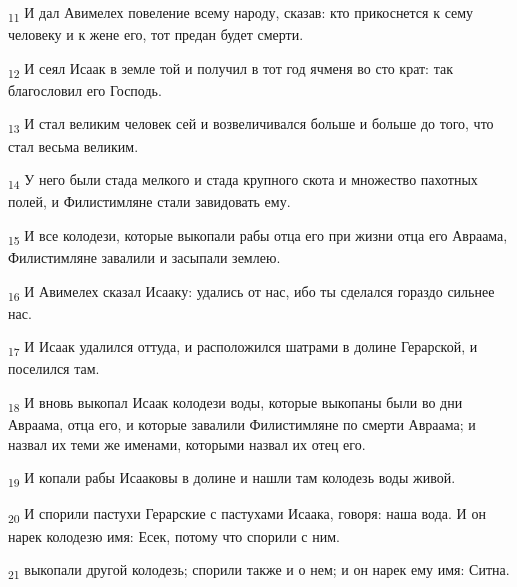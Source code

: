 \begin{tcolorbox}
\textsubscript{11} И дал Авимелех повеление всему народу, сказав: кто прикоснется к сему человеку и к жене его, тот предан будет смерти.
\end{tcolorbox}
\begin{tcolorbox}
\textsubscript{12} И сеял Исаак в земле той и получил в тот год ячменя во сто крат: так благословил его Господь.
\end{tcolorbox}
\begin{tcolorbox}
\textsubscript{13} И стал великим человек сей и возвеличивался больше и больше до того, что стал весьма великим.
\end{tcolorbox}
\begin{tcolorbox}
\textsubscript{14} У него были стада мелкого и стада крупного скота и множество пахотных полей, и Филистимляне стали завидовать ему.
\end{tcolorbox}
\begin{tcolorbox}
\textsubscript{15} И все колодези, которые выкопали рабы отца его при жизни отца его Авраама, Филистимляне завалили и засыпали землею.
\end{tcolorbox}
\begin{tcolorbox}
\textsubscript{16} И Авимелех сказал Исааку: удались от нас, ибо ты сделался гораздо сильнее нас.
\end{tcolorbox}
\begin{tcolorbox}
\textsubscript{17} И Исаак удалился оттуда, и расположился шатрами в долине Герарской, и поселился там.
\end{tcolorbox}
\begin{tcolorbox}
\textsubscript{18} И вновь выкопал Исаак колодези воды, которые выкопаны были во дни Авраама, отца его, и которые завалили Филистимляне по смерти Авраама; и назвал их теми же именами, которыми назвал их отец его.
\end{tcolorbox}
\begin{tcolorbox}
\textsubscript{19} И копали рабы Исааковы в долине и нашли там колодезь воды живой.
\end{tcolorbox}
\begin{tcolorbox}
\textsubscript{20} И спорили пастухи Герарские с пастухами Исаака, говоря: наша вода. И он нарек колодезю имя: Есек, потому что спорили с ним.
\end{tcolorbox}
\begin{tcolorbox}
\textsubscript{21} выкопали другой колодезь; спорили также и о нем; и он нарек ему имя: Ситна.
\end{tcolorbox}
